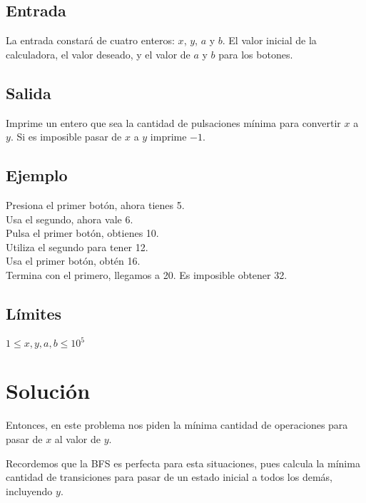 \subsection*{Entrada}

La entrada constará de cuatro enteros: \(x\), \(y\), \(a\) y \(b\). El valor inicial de la calculadora, el valor deseado, y el valor de \(a\) y \(b\) para los botones.

\subsection*{Salida}
Imprime un entero que sea la cantidad de pulsaciones mínima para convertir \(x\) a \(y\). Si es imposible pasar de \(x\) a \(y\) imprime \(-1\).

\subsection*{Ejemplo}
\begin{casebox3}
	{	Presiona el primer botón, ahora tienes 5.\\		
		Usa el segundo, ahora vale 6.\\
		Pulsa el primer botón, obtienes 10.\\
		Utiliza el segundo para tener 12.\\
		Usa el primer botón, obtén 16.\\
		Termina con el primero, llegamos a 20.
	}
	{	Es imposible obtener 32.
	}
\end{casebox3}

\subsection*{Límites}
\begin{plimits}
	\item \(1\leq x,y,a,b \leq 10^5\)
\end{plimits}

\section*{Solución}
Entonces, en este problema nos piden la mínima cantidad de operaciones para pasar de \(x\) al valor de \(y\).

Recordemos que la BFS es perfecta para esta situaciones, pues calcula la mínima cantidad de transiciones para pasar de un estado inicial a todos los demás, incluyendo \(y\).

